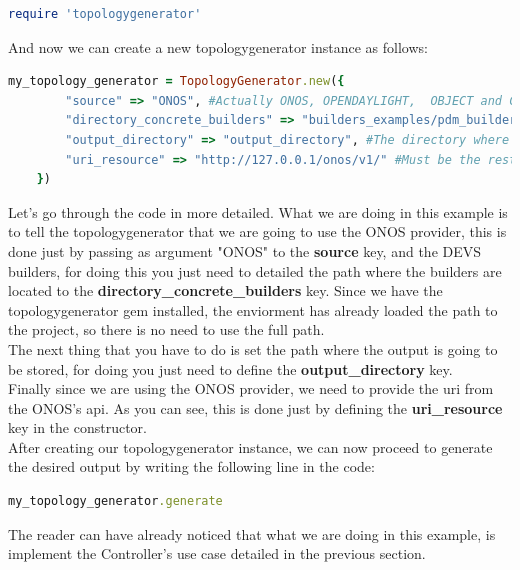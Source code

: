 \begin{lstlisting}[language=Ruby,breaklines=true]
require 'topologygenerator'
\end{lstlisting}

And now we can create a new topologygenerator instance as follows:

\begin{lstlisting}[language=Ruby,breaklines=true]
my_topology_generator = TopologyGenerator.new({
        "source" => "ONOS", #Actually ONOS, OPENDAYLIGHT,  OBJECT and CUSTOM are the options supported
        "directory_concrete_builders" => "builders_examples/pdm_builders", #The directory where builders are located
        "output_directory" => "output_directory", #The directory where the output will be saved
        "uri_resource" => "http://127.0.0.1/onos/v1/" #Must be the rest api uri if either ONOS or OpenDayLight is choosed or the path of a file if CUSTOM is choosed. In case OBJECT is choosed, you will have to provide a valid instance of Topology.
    })
\end{lstlisting}

Let's go through the code in more detailed. What we are doing in this example is to tell the topologygenerator that we are going to use the ONOS provider, this is done just by passing as argument "ONOS" to the \textbf{source} key, and the DEVS builders, for doing this you just need to detailed the path where the builders are located to the \textbf{directory\_concrete\_builders} key. Since we have the topologygenerator gem installed, the enviorment has already loaded the path to the project, so there is no need to use the full path.\\
The next thing that you have to do is set the path where the output is going to be stored, for doing you just need to define the \textbf{output\_directory} key.\\
Finally since we are using the ONOS provider, we need to provide the uri from the ONOS's api. As you can see, this is done just by defining the \textbf{uri\_resource} key in the constructor. \\

After creating our topologygenerator instance, we can now proceed to generate the desired output by writing the following line in the code:

\begin{lstlisting}[language=Ruby,breaklines=true]
my_topology_generator.generate
\end{lstlisting}
 
The reader can have already noticed that what we are doing in this example, is implement the Controller's use case detailed in the previous section.\\


